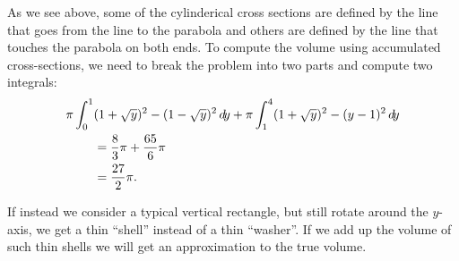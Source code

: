 \documentclass{ximera}
\begin{document}
As we see above, some of the cylinderical cross sections are defined
by the line that goes from the line to the parabola and others are
defined by the line that touches the parabola on both ends.  To
compute the volume using accumulated cross-sections, we need to break
the problem into two parts and compute two integrals:
\begin{align*}
  \pi\int_0^1 &(1+\sqrt{y})^2-(1-\sqrt{y})^2\mathop{}\!d\! y+
  \pi\int_1^4  (1+\sqrt{y})^2-(y-1)^2\mathop{}\!d\! y\\
  &={8\over3}\pi + {65\over6}\pi\\
  &={27\over2}\pi.
\end{align*}

\begin{image}
\end{image}


If instead we consider a typical vertical rectangle, but still rotate
around the $y$-axis, we get a thin ``shell'' instead of a thin
``washer''. If we add up the
volume of such thin shells we will get an approximation to the true
volume.
\end{document}

